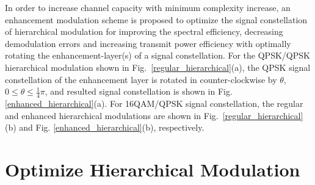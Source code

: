 \documentclass[conference]{IEEEtran}
\begin{document}
In order to increase channel capacity with minimum complexity
increase, an enhancement modulation scheme is proposed to optimize
the signal constellation of hierarchical modulation for improving
the spectral efficiency, decreasing demodulation errors and
increasing transmit power efficiency with optimally rotating the
enhancement-layer(s) of a signal constellation. For the QPSK/QPSK
hierarchical modulation shown in
Fig.~\ref{regular_hierarchical}(a), the QPSK signal constellation
of the enhancement layer is rotated in counter-clockwise by
$\theta$, $0\leq\theta\leq\frac{1}{4}\pi$, and resulted signal
constellation is shown in Fig. \ref{enhanced_hierarchical}(a). For
16QAM/QPSK signal constellation, the regular and enhanced
hierarchical modulations are shown in
Fig.~\ref{regular_hierarchical}(b) and Fig.
\ref{enhanced_hierarchical}(b), respectively.
\begin{figure}
\end{figure}

\section{Optimize Hierarchical Modulation}
\end{document}
